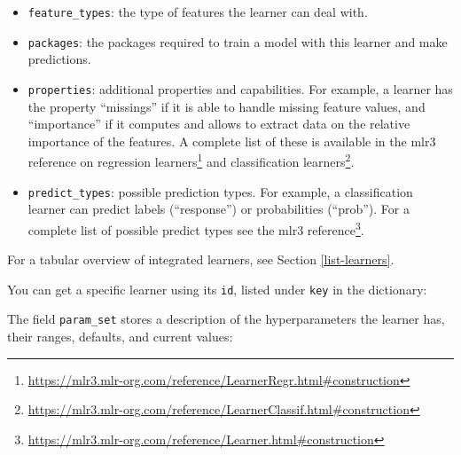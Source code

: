 \documentclass[12pt,]{scrbook}
\newenvironment{Shaded}{}{}
\newcommand{\KeywordTok}[1]{\textcolor[rgb]{0.00,0.00,1.00}{#1}}
\newcommand{\NormalTok}[1]{#1}
\newcommand{\OperatorTok}[1]{#1}
\newcommand{\StringTok}[1]{\textcolor[rgb]{0.00,0.50,0.50}{#1}}
\providecommand{\tightlist}{%
  \setlength{\itemsep}{0pt}\setlength{\parskip}{0pt}}
\renewcommand{\href}[2]{#2\footnote{\url{#1}}}
\begin{document}
\begin{itemize}
\tightlist
\item
  \texttt{feature\_types}: the type of features the learner can deal with.
\item
  \texttt{packages}: the packages required to train a model with this learner and make predictions.
\item
  \texttt{properties}: additional properties and capabilities.
  For example, a learner has the property ``missings'' if it is able to handle missing feature values, and ``importance'' if it computes and allows to extract data on the relative importance of the features.
  A complete list of these is available in the mlr3 reference on \href{https://mlr3.mlr-org.com/reference/LearnerRegr.html\#construction}{regression learners} and \href{https://mlr3.mlr-org.com/reference/LearnerClassif.html\#construction}{classification learners}.
\item
  \texttt{predict\_types}: possible prediction types. For example, a classification learner can predict labels (``response'') or probabilities (``prob''). For a complete list of possible predict types see the \href{https://mlr3.mlr-org.com/reference/Learner.html\#construction}{mlr3 reference}.
\end{itemize}

For a tabular overview of integrated learners, see Section \ref{list-learners}.

You can get a specific learner using its \texttt{id}, listed under \texttt{key} in the dictionary:

\begin{Shaded}
\end{Shaded}

The field \texttt{param\_set} stores a description of the hyperparameters the learner has, their ranges, defaults, and current values:
\end{document}

